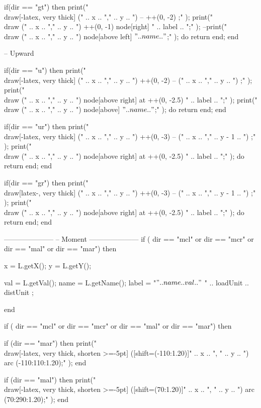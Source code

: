 \begin{luacode}
	if(dir == "gt") then
		print("\\draw[-latex, very thick] (" .. x .. "," .. y .. ") -- ++(0, -2) ;" );
		print("\\draw (" .. x .. "," .. y .. ") ++(0, -1)  node[right]  {" .. label .. "};" );
		--print("\\draw (" .. x .. "," .. y .. ") node[above left] {$" .. name .. "$};" );
		do return end;
	end
	
	-- Upward
	
	if(dir == "u") then
		print("\\draw[-latex, very thick] (" .. x .. "," .. y .. ") ++(0, -2) -- (" .. x .. "," .. y .. ") ;" );
		print("\\draw (" .. x .. "," .. y .. ") node[above right] at ++(0, -2.5) {" .. label .. "};" );
		print("\\draw (" .. x .. "," .. y .. ") node[above] {$" .. name .. "$};" );
		do return end;
	end
	
	if(dir == "ur") then
		print("\\draw[-latex, very thick] (" .. x .. "," .. y .. ") ++(0, -3) -- (" .. x .. "," .. y - 1 .. ") ;" );
		print("\\draw (" .. x .. "," .. y .. ") node[above right] at ++(0, -2.5) {" .. label .. "};" );
		do return end;
	end
	
	if(dir == "gr") then
		print("\\draw[latex-, very thick] (" .. x .. "," .. y .. ") ++(0, -3) -- (" .. x .. "," .. y - 1 .. ") ;" );
		print("\\draw (" .. x .. "," .. y .. ") node[above right] at ++(0, -2.5) {" .. label .. "};" );
		do return end;
	end
	
	
	---------------------
	-- Moment
	---------------------
	if ( dir == "mcl" or dir == "mcr" or dir == "mal" or dir == "mar") then
		
		x = L.getX();
		y = L.getY();
		
		val = L.getVal();
		name = L.getName();
		label = "$" .. name  .. val .. "$ " .. loadUnit .. distUnit ;
		
	end
	
	if ( dir == "mcl" or dir == "mcr" or dir == "mal" or dir == "mar") then
		
		if (dir == "mar") then
			print("\\draw[-latex, very thick, shorten >=-5pt] ([shift=(-110:1.20)]" .. x .. ", " .. y .. ") arc (-110:110:1.20);" );
		end
		
		if (dir == "mal") then
			print("\\draw[-latex, very thick, shorten >=-5pt] ([shift=(70:1.20)]" .. x .. ", " .. y .. ") arc (70:290:1.20);" );
		end
		

\end{luacode}
